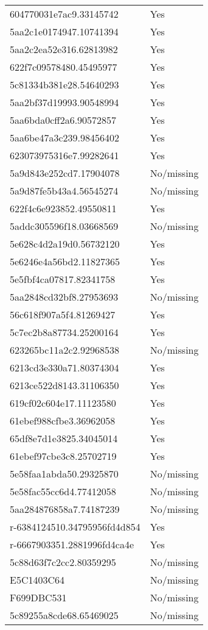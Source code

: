 \begin{tabular}{ll}
604770031e7ac9.33145742 & Yes \\
5aa2c1e0174947.10741394 & Yes \\
5aa2c2ea52e316.62813982 & Yes \\
622f7c09578480.45495977 & Yes \\
5c81334b381e28.54640293 & Yes \\
5aa2bf37d19993.90548994 & Yes \\
5aa6bda0cff2a6.90572857 & Yes \\
5aa6be47a3c239.98456402 & Yes \\
623073975316e7.99282641 & Yes \\
5a9d843e252cd7.17904078 & No/missing \\
5a9d87fe5b43a4.56545274 & No/missing \\
622f4c6e923852.49550811 & Yes \\
5addc305596f18.03668569 & No/missing \\
5e628c4d2a19d0.56732120 & Yes \\
5e6246e4a56bd2.11827365 & Yes \\
5e5fbf4ca07817.82341758 & Yes \\
5aa2848cd32bf8.27953693 & No/missing \\
56c618f907a5f4.81269427 & Yes \\
5c7ec2b8a87734.25200164 & Yes \\
623265bc11a2c2.92968538 & No/missing \\
6213cd3e330a71.80374304 & Yes \\
6213ce522d8143.31106350 & Yes \\
619cf02c604e17.11123580 & Yes \\
61ebef988cfbe3.36962058 & Yes \\
65df8e7d1e3825.34045014 & Yes \\
61ebef97cbe3c8.25702719 & Yes \\
5e58faa1abda50.29325870 & No/missing \\
5e58fac55cc6d4.77412058 & No/missing \\
5aa284876858a7.74187239 & No/missing \\
r-6384124510.34795956fd4d854 & Yes \\
r-6667903351.2881996fd4ca4e & Yes \\
5c88d63f7c2cc2.80359295 & No/missing \\
E5C1403C64 & No/missing \\
F699DBC531 & No/missing \\
5c89255a8cde68.65469025 & No/missing \\

\end{tabular}
